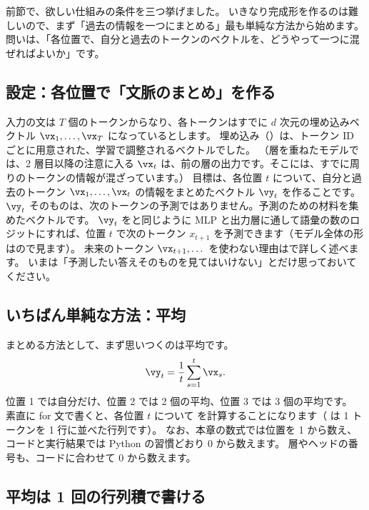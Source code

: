 前節で、欲しい仕組みの条件を三つ挙げました。
いきなり完成形を作るのは難しいので、まず「過去の情報を一つにまとめる」最も単純な方法から始めます。
問いは、「各位置で、自分と過去のトークンのベクトルを、どうやって一つに混ぜればよいか」です。

\subsection*{設定：各位置で「文脈のまとめ」を作る}

入力の文は $T$ 個のトークンからなり、各トークンはすでに $d$ 次元の埋め込みベクトル $\vx_1,\dots,\vx_T$ になっているとします。
埋め込み（）は、トークン ID ごとに用意された、学習で調整されるベクトルでした。
（層を重ねたモデルでは、2 層目以降の注意に入る $\vx_t$ は、前の層の出力です。そこには、すでに周りのトークンの情報が混ざっています。）
目標は、各位置 $t$ について、自分と過去のトークン $\vx_1,\dots,\vx_t$ の情報をまとめたベクトル $\vy_t$ を作ることです。
$\vy_t$ そのものは、次のトークンの予測ではありません。予測のための材料を集めたベクトルです。
$\vy_t$ をと同じように MLP と出力層に通して語彙の数のロジットにすれば、位置 $t$ で次のトークン $x_{t+1}$ を予測できます（モデル全体の形はので見ます）。
未来のトークン $\vx_{t+1},\dots$ を使わない理由はで詳しく述べます。
いまは「予測したい答えそのものを見てはいけない」とだけ思っておいてください。

\subsection*{いちばん単純な方法：平均}

まとめる方法として、まず思いつくのは平均です。
\begin{equation}
\vy_t = \frac{1}{t}\sum_{s=1}^{t} \vx_s .
\label{eq:attn-mean}
\end{equation}
位置 1 では自分だけ、位置 2 では 2 個の平均、位置 3 では 3 個の平均です。
素直に for 文で書くと、各位置 $t$ について  を計算することになります（ は 1 トークンを 1 行に並べた行列です）。
なお、本章の数式では位置を 1 から数え、コードと実行結果では Python の習慣どおり 0 から数えます。
層やヘッドの番号も、コードに合わせて 0 から数えます。

\subsection*{平均は 1 回の行列積で書ける}

